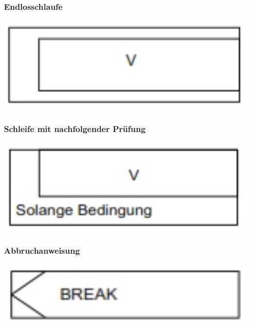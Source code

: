 		\begin{minipage}[t]{6 cm}
			\subsubsection{Endlosschlaufe}
				\includegraphics[width=1\textwidth]{pics/Nassi_While1.jpg}
											
			\subsubsection{Schleife mit nachfolgender Prüfung}
				\includegraphics[width=1\textwidth]{pics/Nassi_DoWhile.jpg}	
					
			\subsubsection{Abbruchanweisung}
				\includegraphics[width=1\textwidth]{pics/Nassi_Break.jpg}	
								
		\end{minipage}